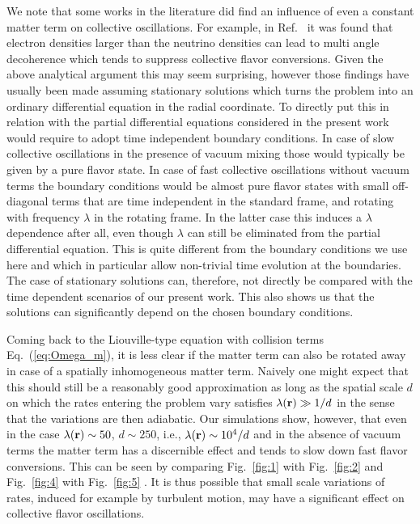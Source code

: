 \documentclass[prd,aps]{revtex4-2}
\begin{document}
We note that some works in the literature did find an influence of even a constant matter
term on collective oscillations. For example, in Ref.~\cite{Esteban-Pretel:2008ovd} it was found
that electron densities larger than the neutrino densities can lead to multi angle decoherence
which tends to suppress collective flavor conversions. Given the above analytical argument this
may seem surprising, however those findings have usually been made assuming stationary
solutions which turns the problem into an ordinary differential equation in the radial coordinate.
To directly put this in relation with the partial differential equations considered in the present
work would require to adopt time independent boundary conditions. In case of slow collective
oscillations in the presence of vacuum mixing those would typically be given by a pure
flavor state. In case of fast collective oscillations without vacuum terms the boundary conditions
would be almost pure flavor states with small off-diagonal terms that are time independent
in the standard frame, and rotating with frequency $\lambda$ in the rotating frame. In the latter
case this induces a $\lambda$ dependence after all, even though $\lambda$ can still be eliminated
from the partial differential equation. This is
quite different from the boundary conditions we use here and which in particular allow non-trivial
time evolution at the boundaries. The case of stationary solutions can, therefore, not directly
be compared with the time dependent scenarios of our present work. This also shows us that the
solutions can significantly depend on the chosen boundary conditions.

Coming back to the Liouville-type equation with collision terms Eq.~(\ref{eq:Omega_m}), it is less clear if the matter
term can also be rotated away in case of a spatially inhomogeneous matter term.
Naively one might expect that this should still be a reasonably good approximation as long as the spatial scale
$d$ on which the rates entering the problem vary satisfies $\lambda({\bf r})\gg1/d$ in the sense that the variations 
are then adiabatic. Our simulations show, however, that even in the case $\lambda({\bf r})\sim50$, $d\sim250$, i.e.,
$\lambda({\bf r})\sim10^4/d$ and in the absence of vacuum terms the matter term
has a discernible effect and tends to slow down fast flavor conversions. This can be seen by comparing
Fig.~\ref{fig:1} with Fig.~\ref{fig:2} and Fig.~\ref{fig:4} with Fig.~\ref{fig:5} . It is thus possible that small scale 
variations of rates, induced for example by turbulent motion, may have a significant effect on collective flavor 
oscillations.
\end{document}
